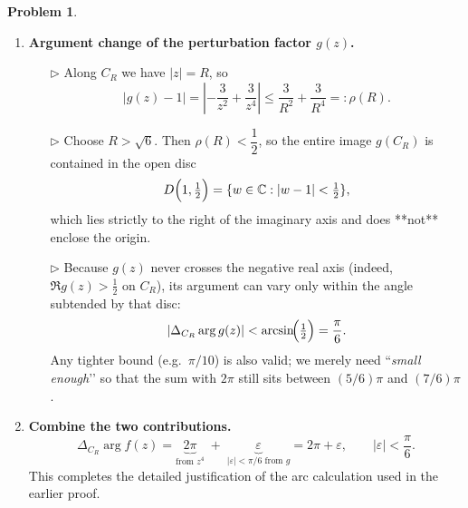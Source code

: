 \documentclass[12pt]{article}
\theoremstyle{definition} %
\newtheorem{problem}{Problem}
\theoremstyle{plain} %
\begin{document}
\begin{problem}
\begin{enumerate}
        \item \textbf{Argument change of the perturbation factor \(g(z)\).}

              \begin{enumerate}
                  \item[$\triangleright$]  
                        Along \(C_{R}\) we have \(|z|=R\), so
                        \[
                            |g(z)-1|
                            = \left|-\frac{3}{z^{2}}+\frac{3}{z^{4}}\right|
                            \le \frac{3}{R^{2}}+\frac{3}{R^{4}}
                            =: \rho(R).
                        \]
                  \item[$\triangleright$]  
                        Choose \(R>\sqrt6\).  Then
                        \(\rho(R)<\dfrac12\), so the entire image \(g(C_{R})\)
                        is contained in the open disc
                        \[
                            D\Bigl(1,\tfrac12\Bigr)
                            =\{w\in\mathbb C : |w-1|<\tfrac12\},
                        \]
                        which lies strictly to the right of the imaginary axis
                        and does **not** enclose the origin.
                  \item[$\triangleright$]  
                        Because \(g(z)\) never crosses the negative real axis
                        (indeed, \(\Re g(z) > \tfrac12\) on \(C_{R}\)),
                        its argument can vary only within the angle subtended by
                        that disc:
                        \[
                            |\Delta_{C_R}\arg g(z)|
                            < \arcsin\!\Bigl(\tfrac12\Bigr)
                            = \frac{\pi}{6}.
                        \]
                        Any tighter bound (e.g.\ \(\pi/10\)) is also valid; we
                        merely need “\emph{small enough}’’ so that the sum with
                        \(2\pi\) still sits between \((5/6)\pi\) and \((7/6)\pi\).
              \end{enumerate}

        \item \textbf{Combine the two contributions.}
              \[
                  \Delta_{C_R}\arg f(z)
                  = \underbrace{2\pi}_{\text{from }z^{4}}
                    \;+\;
                    \underbrace{\varepsilon}_{|\varepsilon|<\pi/6\text{ from }g}
                  = 2\pi+\varepsilon,
                  \qquad |\varepsilon|<\frac{\pi}{6}.
              \]
              This completes the detailed justification of the arc
              calculation used in the earlier proof.
    \end{enumerate}
\end{problem}
\end{document}

